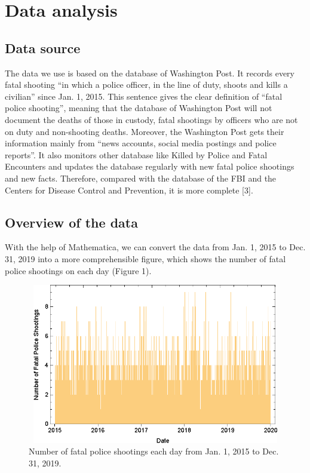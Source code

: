 \documentclass[a4paper]{article}
\begin{document}
\section{Data analysis}
	\subsection{Data source}
	The data we use is based on the database of Washington Post. It records every fatal shooting “in which a police officer, in the line of duty, shoots and kills a civilian” since Jan. 1, 2015. This sentence gives the clear definition of “fatal police shooting”, meaning that the database of Washington Post will not document the deaths of those in custody, fatal shootings by officers who are not on duty and non-shooting deaths. Moreover, the Washington Post gets their information mainly from “news accounts, social media postings and police reports”. It also monitors other database like Killed by Police and Fatal Encounters and updates the database regularly with new fatal police shootings and new facts. Therefore, compared with the database of the FBI and the Centers for Disease Control and Prevention, it is more complete [3].

	\subsection{Overview of the data}
	With the help of Mathematica, we can convert the data from Jan. 1, 2015 to Dec. 31, 2019 into a more comprehensible figure, which shows the number of fatal police shootings on each day (Figure 1).
	
	\begin{figure}[H]
	\centering
	\includegraphics[height=7cm,width=14cm]{Overall(2).eps}
	\caption{Number of fatal police shootings each day from Jan. 1, 2015 to Dec. 31, 2019.}
	\end{figure}
\end{document}
